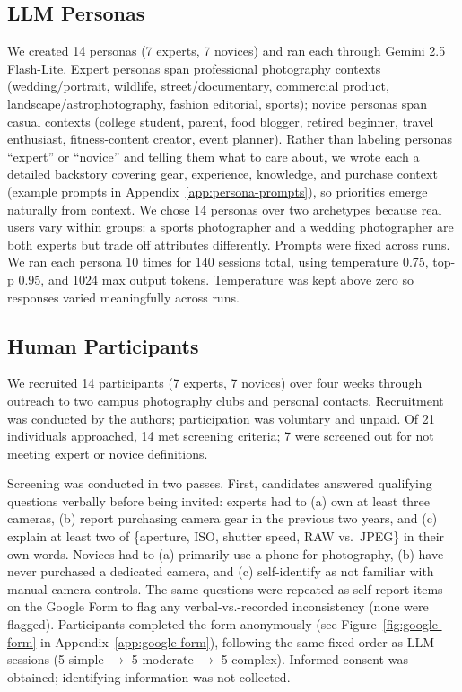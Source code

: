 \documentclass[manuscript,review]{acmart}
\begin{document}
\subsection{LLM Personas}
We created 14 personas (7 experts, 7 novices) and ran each through Gemini 2.5 Flash-Lite. Expert personas span professional photography contexts (wedding/portrait, wildlife, street/documentary, commercial product, landscape/astrophotography, fashion editorial, sports); novice personas span casual contexts (college student, parent, food blogger, retired beginner, travel enthusiast, fitness-content creator, event planner). Rather than labeling personas ``expert'' or ``novice'' and telling them what to care about, we wrote each a detailed backstory covering gear, experience, knowledge, and purchase context (example prompts in Appendix~\ref{app:persona-prompts}), so priorities emerge naturally from context. We chose 14 personas over two archetypes because real users vary within groups: a sports photographer and a wedding photographer are both experts but trade off attributes differently. Prompts were fixed across runs. We ran each persona 10 times for 140 sessions total, using temperature 0.75, top-p 0.95, and 1024 max output tokens. Temperature was kept above zero so responses varied meaningfully across runs.

\subsection{Human Participants}
We recruited 14 participants (7 experts, 7 novices) over four weeks through outreach to two campus photography clubs and personal contacts. Recruitment was conducted by the authors; participation was voluntary and unpaid. Of 21 individuals approached, 14 met screening criteria; 7 were screened out for not meeting expert or novice definitions.

Screening was conducted in two passes. First, candidates answered qualifying questions verbally before being invited: experts had to (a) own at least three cameras, (b) report purchasing camera gear in the previous two years, and (c) explain at least two of \{aperture, ISO, shutter speed, RAW vs.\ JPEG\} in their own words. Novices had to (a) primarily use a phone for photography, (b) have never purchased a dedicated camera, and (c) self-identify as not familiar with manual camera controls. The same questions were repeated as self-report items on the Google Form to flag any verbal-vs.-recorded inconsistency (none were flagged). Participants completed the form anonymously (see Figure~\ref{fig:google-form} in Appendix~\ref{app:google-form}), following the same fixed order as LLM sessions (5 simple $\rightarrow$ 5 moderate $\rightarrow$ 5 complex). Informed consent was obtained; identifying information was not collected.
\end{document}
